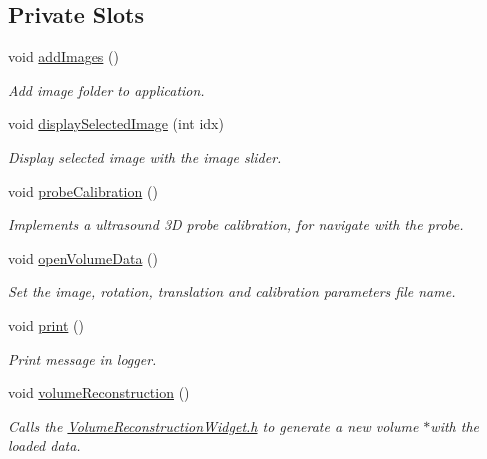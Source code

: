 \subsection*{Private Slots}
\begin{DoxyCompactItemize}
\item 
void \hyperlink{class_main_window_afdd9e98dfe3d68ab08aed2df37e8c1dc}{add\-Images} ()
\begin{DoxyCompactList}\small\item\em Add image folder to application. \end{DoxyCompactList}\item 
void \hyperlink{class_main_window_a67ec1c2d082b1b5a63347df9660275f1}{display\-Selected\-Image} (int idx)
\begin{DoxyCompactList}\small\item\em Display selected image with the image slider. \end{DoxyCompactList}\item 
void \hyperlink{class_main_window_a7a01aa3ba0210c1915d53d37d7272a13}{probe\-Calibration} ()
\begin{DoxyCompactList}\small\item\em Implements a ultrasound 3\-D probe calibration, for navigate with the probe. \end{DoxyCompactList}\item 
void \hyperlink{class_main_window_a66293ccc95d836b4b014e6bdc5e2ae9f}{open\-Volume\-Data} ()
\begin{DoxyCompactList}\small\item\em Set the image, rotation, translation and calibration parameters file name. \end{DoxyCompactList}\item 
void \hyperlink{class_main_window_a873aaee370c1456b99f1a2399ff13691}{print} ()
\begin{DoxyCompactList}\small\item\em Print message in logger. \end{DoxyCompactList}\item 
void \hyperlink{class_main_window_a51a6d66666f907cee479298f561a87c6}{volume\-Reconstruction} ()
\begin{DoxyCompactList}\small\item\em Calls the \hyperlink{_volume_reconstruction_widget_8h}{Volume\-Reconstruction\-Widget.\-h} to generate a new volume $\ast$with the loaded data. \end{DoxyCompactList}\end{DoxyCompactItemize}
